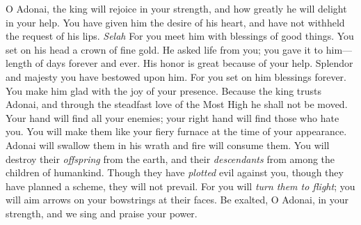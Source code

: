 \begin{biblechapter} %
 O Adonai, the king will rejoice in your strength, 
and how greatly he will delight in your help.
\verse You have given him the desire of his heart, 
and have not withheld the request of his lips. \textit{Selah}
\verse For you meet him with blessings of good things. 
You set on his head a crown of fine gold.
\verse He asked life from you; you gave it to him— 
length of days forever and ever.
\verse His honor is great because of your help. 
Splendor and majesty you have bestowed upon him.
\verse For you set on him blessings forever. 
You make him glad with the joy of your presence.
\verse Because the king trusts Adonai, 
and through the steadfast love of the Most High 
he shall not be moved.
\verse Your hand will find all your enemies; 
your right hand will find those who hate you.
\verse You will make them like your fiery furnace 
at the time of your appearance. 
Adonai will swallow them in his wrath 
and fire will consume them.
\verse You will destroy their \textit{offspring} from the earth, 
and their \textit{descendants} from among the children of humankind.
\verse Though they have \textit{plotted} evil against you, 
though they have planned a scheme, they will not prevail.
\verse For you will \textit{turn them to flight}; 
you will aim arrows on your bowstrings at their faces.
\verse Be exalted, O Adonai, in your strength, 
and we sing and praise your power.
\end{biblechapter}


